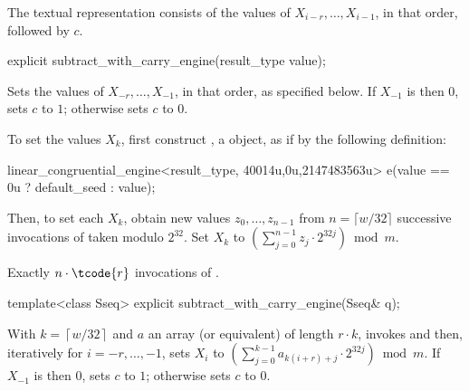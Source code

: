 \pnum
The textual representation%
%
consists of the values of
 $X_{i-r}, \dotsc, X_{i-1}$,
in that order, followed by $c$.

\begin{indexed}{}
\begin{itemdecl}
explicit subtract_with_carry_engine(result_type value);
\end{itemdecl}
\end{indexed}

\begin{itemdescr}
\pnum
\effects
 Sets the values of
 $X_{-r}, \dotsc, X_{-1}$,
 in that order, as specified below.
 If $X_{-1}$ is then $0$,
 sets $c$ to $1$;
 otherwise sets $c$ to $0$.

 To set the values $X_k$,
 first construct , a  object,
 as if by the following definition:
\begin{codeblock}
linear_congruential_engine<result_type,
                          40014u,0u,2147483563u> e(value == 0u ? default_seed : value);
\end{codeblock}
 Then, to set each $X_k$,
 obtain new values $z_0, \dotsc, z_{n-1}$
 from $n = \lceil w/32 \rceil$ successive invocations
 of  taken modulo $2^{32}$.
 Set $X_k$ to $\left( \sum_{j=0}^{n-1} z_j \cdot 2^{32j}\right) \bmod m$.

\pnum
\complexity
Exactly $n \cdot \tcode{r}$ invocations
 of .
\end{itemdescr}

\begin{indexed}{}
\begin{itemdecl}
template<class Sseq> explicit subtract_with_carry_engine(Sseq& q);
\end{itemdecl}
\end{indexed}

\begin{itemdescr}
\pnum
\effects
 With
 $k = \left\lceil w / 32 \right\rceil$
 and $a$ an array (or equivalent)
 of length $r \cdot k$,
 invokes 
 and then, iteratively for $i = -r, \dotsc, -1$,
 sets $X_i$
 to $ \left(\sum_{j=0}^{k-1}a_{k(i+r)+j} \cdot 2^{32j} \right) \bmod m $.
 If $X_{-1}$ is then $0$,
 sets $c$ to $1$;
 otherwise sets $c$ to $0$.
\end{itemdescr}


